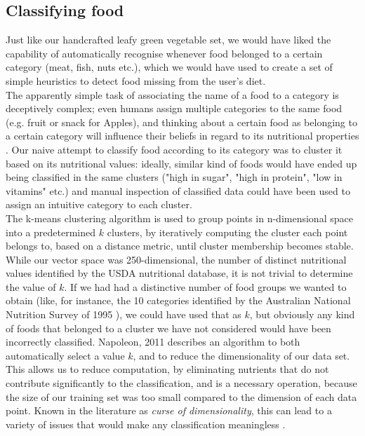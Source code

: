 \subsection{Classifying food}
Just like our handcrafted leafy green vegetable set, we would have liked the capability of automatically recognise whenever food belonged to a certain category (meat, fish, nuts etc.), which we would have used to create a set of simple heuristics to detect food missing from the user's diet. \\
The apparently simple task of associating the name of a food to a category is deceptively complex; even humans assign multiple categories to the same food (e.g. fruit or snack for Apples), and thinking about a certain food as belonging to a certain category will influence their beliefs in regard to its nutritional properties \cite{Hayes2011}.
Our naive attempt to classify food  according to its category was to cluster it based on its nutritional values: ideally, similar kind of foods would have ended up being classified in the same clusters ("high in sugar", "high in protein", "low in vitamins" etc.) and manual inspection of classified data could have been used to assign an intuitive category to each cluster. \\
The k-means clustering algorithm is used to group points in n-dimensional space into a predetermined $k$ clusters, by iteratively computing the cluster each point belongs to, based on a distance metric, until cluster membership becomes stable. While our vector space was 250-dimensional, the number of distinct nutritional values identified by the USDA nutritional database, it is not trivial to determine the value of $k$. If we had had a distinctive number of food groups we wanted to obtain (like, for instance, the 10 categories identified by the Australian National Nutrition Survey of 1995 \cite{NNS1995}), we could have used that as $k$, but obviously any kind of foods that belonged to a cluster we have not considered would have been incorrectly classified. Napoleon, 2011 \cite{napoleon} describes an algorithm to both automatically select a value $k$, and to reduce the dimensionality of our data set. This allows us to reduce computation, by eliminating nutrients that do not contribute significantly to the classification, and is a necessary operation, because the size of our training set was too small compared to the dimension of each data point. Known in the literature as \textit{curse of dimensionality}, this can lead to a variety of issues that would make any classification meaningless \cite{kriegel2009}.\\
